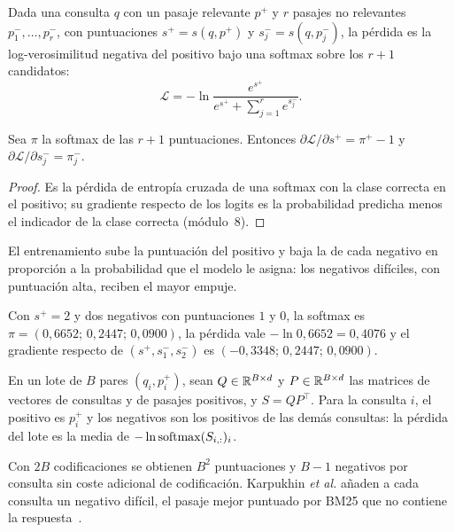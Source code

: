 \begin{definicion}\label{def:contrastiva}
Dada una consulta $q$ con un pasaje relevante $p^{+}$ y $r$ pasajes no relevantes $p^{-}_1,\dots,p^{-}_r$, con puntuaciones $s^{+}=s(q,p^{+})$ y $s^{-}_j=s(q,p^{-}_j)$, la pérdida es la log-verosimilitud negativa del positivo bajo una softmax sobre los $r+1$ candidatos:
\[
\mathcal{L}=-\ln\frac{e^{s^{+}}}{e^{s^{+}}+\sum_{j=1}^{r}e^{s^{-}_j}} .
\]
\end{definicion}

\begin{proposicion}\label{prop:grad-contrastiva}
Sea $\pi$ la softmax de las $r+1$ puntuaciones. Entonces $\partial\mathcal{L}/\partial s^{+}=\pi^{+}-1$ y $\partial\mathcal{L}/\partial s^{-}_j=\pi^{-}_j$.
\end{proposicion}

\begin{proof}
Es la pérdida de entropía cruzada de una softmax con la clase correcta en el positivo; su gradiente respecto de los logits es la probabilidad predicha menos el indicador de la clase correcta (módulo~8).
\end{proof}

El entrenamiento sube la puntuación del positivo y baja la de cada negativo en proporción a la probabilidad que el modelo le asigna: los negativos difíciles, con puntuación alta, reciben el mayor empuje.

\begin{ejemplo}\label{ej:contrastiva}
Con $s^{+}=2$ y dos negativos con puntuaciones $1$ y $0$, la softmax es $\pi=(0{,}6652;\,0{,}2447;\,0{,}0900)$, la pérdida vale $-\ln 0{,}6652=0{,}4076$ y el gradiente respecto de $(s^{+},s^{-}_1,s^{-}_2)$ es $(-0{,}3348;\,0{,}2447;\,0{,}0900)$.
\end{ejemplo}

\begin{definicion}\label{def:inbatch}
En un lote de $B$ pares $(q_i,p_i^{+})$, sean $Q\in\mathbb{R}^{B\times d}$ y $P\in\mathbb{R}^{B\times d}$ las matrices de vectores de consultas y de pasajes positivos, y $S=QP^{\top}$. Para la consulta $i$, el positivo es $p_i^{+}$ y los negativos son los positivos de las demás consultas: la pérdida del lote es la media de $-\ln\operatorname{softmax}(S_{i,:})_i$.
\end{definicion}

Con $2B$ codificaciones se obtienen $B^{2}$ puntuaciones y $B-1$ negativos por consulta sin coste adicional de codificación. Karpukhin \emph{et al.} añaden a cada consulta un negativo difícil, el pasaje mejor puntuado por BM25 que no contiene la respuesta~\cite{dpr}.


